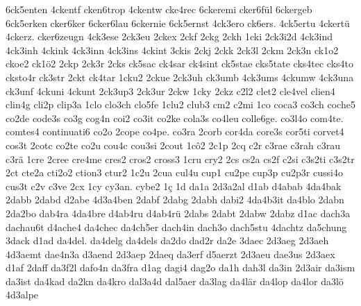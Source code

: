 {    6ck5enten
    4ckentf
    cken6trop
    4ckentw
    cke4rec
    6ckeremi
    cker6fül
    6ckergeb
    6ck5erken
    cker6ker
    6cker6lau
    6ckernie
    6ck5ernst
    4ck3ero
    ck6ers.
    4ck5ertu
    4ckertü
    4ckerz.
    cker6zeugn
    4ck3ese
    2ck3eu
    2ckex
    2ckf
    2ckg
    2ckh
    1cki
    2ck3i2d
    4ck3ind
    4ck3inh
    4ckink
    4ck3inn
    4ck3ins
    4ckint
    3ckis
    2ckj
    2ckk
    2ck3l
    2ckm
    2ck3n
    ck1o2
    ckoe2
    ck1ö2
    2ckp
    2ck3r
    2cks
    ck5sac
    ck4sar
    ck4sint
    ck5stae
    cks5tate
    cks4tec
    cks4to
    cksto4r
    ck3str
    2ckt
    ck4tar
    1cku2
    2ckue
    2ck3uh
    ck3umb
    4ck3ums
    4ckumw
    4ck3una
    ck3unf
    4ckuni
    4ckunt
    2ck3up3
    2ck3ur
    2ckw
    1cky
    2ckz
    c2l2
    clet2
    cle4vel
    clien4
    clin4g
    cli2p
    clip3a
    1clo
    clo3ch
    clo5fe
    1clu2
    club3
    cm2
    c2mi
    1co
    coca3
    co3ch
    coche5
    co2de
    code3s
    co3g
    cog4n
    coi2
    co3it
    co2ke
    cola3s
    co4leu
    colle6ge.
    co3l4o
    com4te.
    comtes4
    continuati6
    co2o
    2cope
    co4pe.
    co3ra
    2corb
    cor4da
    core3s
    cor5ti
    corvet4
    cos3t
    2cotc
    co2te
    co2u
    cou4c
    cou3si
    2cout
    1cô2
    2c1p
    2cq
    c2r
    c3rae
    c3rah
    c3rau
    c3rä
    1cre
    2cree
    cre4me
    cres2
    cros2
    cross3
    1cru
    cry2
    2cs
    cs2a
    cs2f
    c2si
    c3s2ti
    c3s2tr
    2ct
    cte2a
    cti2o2
    ction3
    ctur2
    1c2u
    2cua
    cul4u
    cup1
    cu2pe
    cup3p
    cu2p3r
    cussi4o
    cus3t
    c2v
    c3ve
    2cx
    1cy
    cy3an.
    cybe2
    1ç
    1d
    da1a
    2d3a2al
    d1ab
    d4abab
    4da4bak
    2dabb
    2dabd
    d2abe
    4d3a4ben
    2dabf
    2dabg
    2dabh
    dabi2
    4da4b3it
    da4blo
    2dabn
    2da2bo
    dab4ra
    4da4bre
    d4ab4ru
    d4ab4rü
    2dabs
    2dabt
    2dabw
    2dabz
    d1ac
    dach3a
    dachau6t
    d4ache4
    da4chec
    da4ch5er
    dach4in
    dach3o
    dach5stu
    4dachtz
    da5chung
    3dack
    d1ad
    da4del.
    da4delg
    da4dels
    da2do
    dad2r
    da2e
    3daec
    2d3aeg
    2d3aeh
    4d3aemt
    dae4n3a
    d3aend
    2d3aep
    2daeq
    da3erf
    d5aerzt
    2d3aeu
    dae3us
    2d3aex
    d1af
    2daff
    da3f2l
    dafo4n
    da3fra
    d1ag
    dagi4
    dag2o
    da1h
    dah3l
    da3in
    2d3air
    da3ism
    da3ist
    da4kad
    da2kn
    da4kro
    dal3a4d
    dal5aer
    da3lag
    da4lär
    da4lop
    da4lor
    da3lö
    4d3alpe
}

